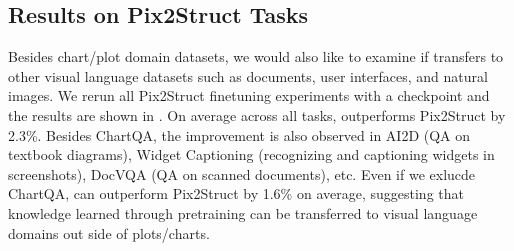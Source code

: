\subsection{Results on Pix2Struct Tasks}\label{sec:p2s_tasks}

Besides chart/plot domain datasets, we would also like to examine if \model{} transfers to other visual language datasets such as documents, user interfaces, and natural images. We rerun all Pix2Struct finetuning experiments with a \model{} checkpoint and the results are shown in . On average across all tasks, \model{} outperforms Pix2Struct by 2.3\%. Besides ChartQA, the improvement is also observed in AI2D (QA on textbook diagrams), Widget Captioning (recognizing and captioning widgets in screenshots), DocVQA (QA on scanned documents), etc. Even if we exlucde ChartQA, \model{} can outperform Pix2Struct by 1.6\% on average, suggesting that knowledge learned through \model{} pretraining can be transferred to visual language domains out side of plots/charts.

\begin{table*}[!ht]
    \centering
\setlength{\tabcolsep}{5pt}
\caption{\model{} vs. Pix2Sturct on Pix2Sturct tasks.}
\label{tab:matcha_vs_p2s}
\end{table*}


